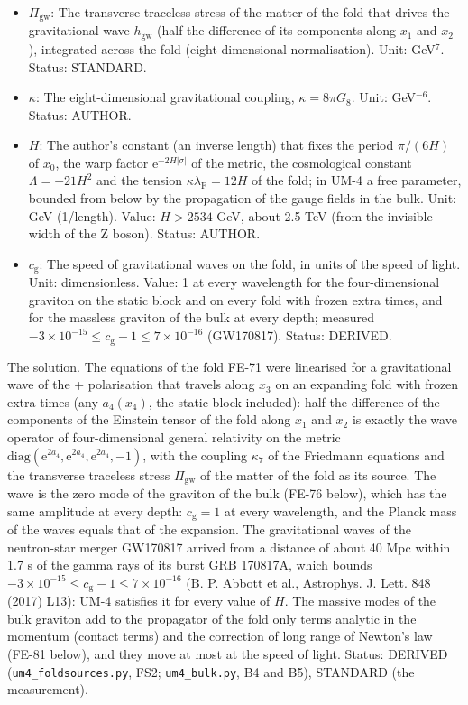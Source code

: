 \documentclass[
  10pt,
]{article}
\begin{document}
\begin{itemize}
  DERIVED.
\item
  \(\Pi_{\mathrm{gw}}\): The transverse traceless stress of the matter
  of the fold that drives the gravitational wave \(h_{\mathrm{gw}}\)
  (half the difference of its components along \(x_1\) and \(x_2\)),
  integrated across the fold (eight-dimensional normalisation). Unit:
  GeV\(^7\). Status: STANDARD.
\item
  \(\kappa\): The eight-dimensional gravitational coupling,
  \(\kappa = 8\pi G_8\). Unit: GeV\(^{-6}\). Status: AUTHOR.
\item
  \(H\): The author's constant (an inverse length) that fixes the period
  \(\pi/(6H)\) of \(x_0\), the warp factor
  \(\mathrm{e}^{-2H\lvert\sigma\rvert}\) of the metric, the cosmological
  constant \(\Lambda = -21H^2\) and the tension
  \(\kappa\lambda_{\mathrm{F}} = 12H\) of the fold; in UM-4 a free
  parameter, bounded from below by the propagation of the gauge fields
  in the bulk. Unit: GeV (1/length). Value: \(H > 2534\) GeV, about 2.5
  TeV (from the invisible width of the Z boson). Status: AUTHOR.
\item
  \(c_{\mathrm{g}}\): The speed of gravitational waves on the fold, in
  units of the speed of light. Unit: dimensionless. Value: 1 at every
  wavelength for the four-dimensional graviton on the static block and
  on every fold with frozen extra times, and for the massless graviton
  of the bulk at every depth; measured
  \(-3\times10^{-15} \le c_{\mathrm{g}} - 1 \le 7\times10^{-16}\)
  (GW170817). Status: DERIVED.
\end{itemize}

The solution. The equations of the fold FE-71 were linearised for a
gravitational wave of the + polarisation that travels along \(x_3\) on
an expanding fold with frozen extra times (any \(a_4(x_4)\), the static
block included): half the difference of the components of the Einstein
tensor of the fold along \(x_1\) and \(x_2\) is exactly the wave
operator of four-dimensional general relativity on the metric
\(\mathrm{diag}(\mathrm{e}^{2a_4}, \mathrm{e}^{2a_4}, \mathrm{e}^{2a_4}, -1)\),
with the coupling \(\kappa_7\) of the Friedmann equations and the
transverse traceless stress \(\Pi_{\mathrm{gw}}\) of the matter of the
fold as its source. The wave is the zero mode of the graviton of the
bulk (FE-76 below), which has the same amplitude at every depth:
\(c_{\mathrm{g}} = 1\) at every wavelength, and the Planck mass of the
waves equals that of the expansion. The gravitational waves of the
neutron-star merger GW170817 arrived from a distance of about 40 Mpc
within 1.7 s of the gamma rays of its burst GRB 170817A, which bounds
\(-3\times10^{-15} \le c_{\mathrm{g}} - 1 \le 7\times10^{-16}\) (B. P.
Abbott et al., Astrophys. J. Lett. 848 (2017) L13): UM-4 satisfies it
for every value of \(H\). The massive modes of the bulk graviton add to
the propagator of the fold only terms analytic in the momentum (contact
terms) and the correction of long range of Newton's law (FE-81 below),
and they move at most at the speed of light. Status: DERIVED
(\texttt{um4\_foldsources.py}, FS2; \texttt{um4\_bulk.py}, B4 and B5),
STANDARD (the measurement).
\end{document}

